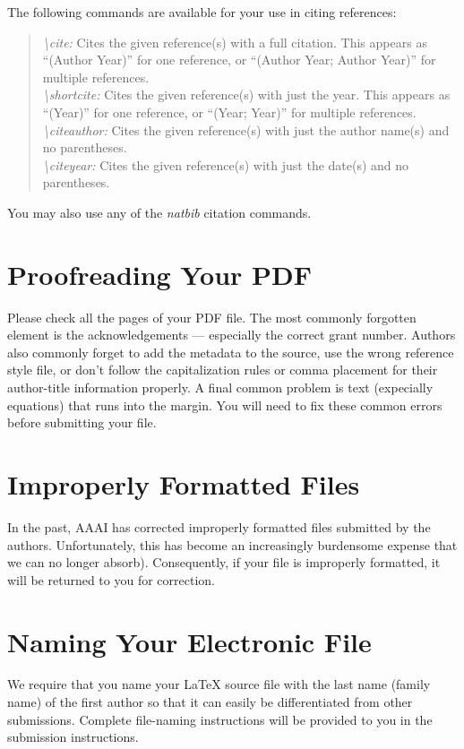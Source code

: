 The following commands are available for your use in citing references:
\begin{quote}
{\em \textbackslash cite:} Cites the given reference(s) with a full citation. This appears as ``(Author Year)'' for one reference, or ``(Author Year; Author Year)'' for multiple references.\smallskip\\
{\em \textbackslash shortcite:} Cites the given reference(s) with just the year. This appears as ``(Year)'' for one reference, or ``(Year; Year)'' for multiple references.\smallskip\\
{\em \textbackslash citeauthor:} Cites the given reference(s) with just the author name(s) and no parentheses.\smallskip\\
{\em \textbackslash citeyear:} Cites the given reference(s) with just the date(s) and no parentheses.
\end{quote}
You may also use any of the \emph{natbib} citation commands.


\section{Proofreading Your PDF}
Please check all the pages of your PDF file. The most commonly forgotten element is the acknowledgements --- especially the correct grant number. Authors also commonly forget to add the metadata to the source, use the wrong reference style file, or don't follow the capitalization rules or comma placement for their author-title information properly. A final common problem is text (expecially equations) that runs into the margin. You will need to fix these common errors before submitting your file.

\section{Improperly Formatted Files }
In the past, AAAI has corrected improperly formatted files submitted by the authors. Unfortunately, this has become an increasingly burdensome expense that we can no longer absorb). Consequently, if your file is improperly formatted, it will be returned to you for correction.

\section{Naming Your Electronic File}
We require that you name your \LaTeX{} source file with the last name (family name) of the first author so that it can easily be differentiated from other submissions. Complete file-naming instructions will be provided to you in the submission instructions.

